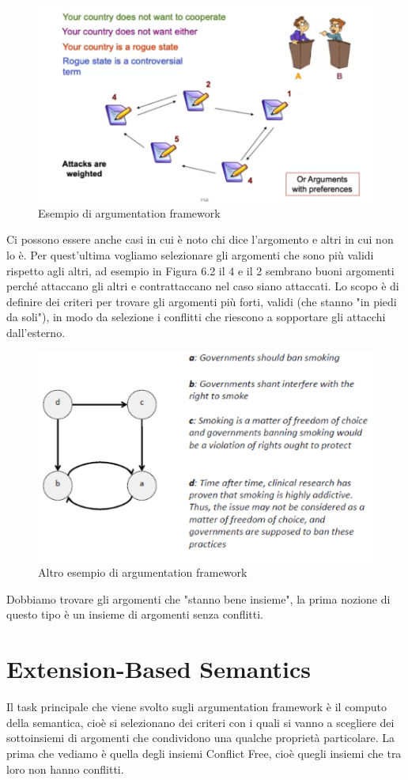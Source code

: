 \begin{figure}[htp]
    \centering
    \includegraphics[width=12cm, keepaspectratio]{img/Cap6/arg2.png}
    \caption{Esempio di argumentation framework}
\end{figure}
Ci possono essere anche casi in cui è noto chi dice l'argomento e altri in cui
non lo è. Per quest'ultima vogliamo selezionare gli argomenti che sono più
validi rispetto agli altri, ad esempio in Figura 6.2 il 4 e il 2 sembrano buoni
argomenti perché attaccano gli altri e contrattaccano nel caso siano attaccati.
Lo scopo è di definire dei criteri per trovare gli argomenti più forti, validi
(che stanno "in piedi da soli"), in modo da selezione i conflitti che riescono a
sopportare gli attacchi dall'esterno.
\begin{figure}[htp]
    \centering
    \includegraphics[width=12cm, keepaspectratio]{img/Cap6/arg3.png}
    \caption{Altro esempio di argumentation framework}
\end{figure}
Dobbiamo trovare gli argomenti che "stanno bene insieme", la prima nozione di
questo tipo è un insieme di argomenti senza conflitti.

\section{Extension-Based Semantics}
Il task principale che viene svolto sugli argumentation framework è il computo
della semantica, cioè si selezionano dei criteri con i quali si vanno a
scegliere dei sottoinsiemi di argomenti che condividono una qualche proprietà
particolare. La prima che vediamo è quella degli insiemi Conflict Free, cioè
quegli insiemi che tra loro non hanno conflitti.
